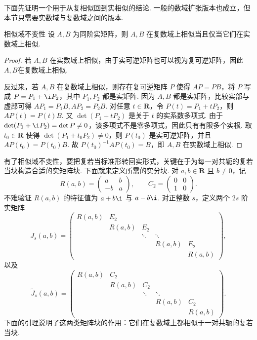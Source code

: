 下面先证明一个用于从复相似回到实相似的结论. 一般的数域扩张版本也成立，但本节只需要实数域与复数域之间的版本.

\begin{theorem}{}{相似域不变性}
    设 $A, B$ 为同阶实矩阵，则 $A, B$ 在复数域上相似当且仅当它们在实数域上相似.
\end{theorem}
\begin{proof}
    若 $A, B$ 在实数域上相似，由于实可逆矩阵也可以视为复可逆矩阵，因此$A,B$在复数域上相似.

    反过来，若 $A, B$ 在复数域上相似，则存在复可逆矩阵 $P$ 使得 $AP = PB$，将 $P$ 写成 $P = P_1 + \i P_2$，其中 $P_1, P_2$ 都是实矩阵. 因为 $A, B$ 都是实矩阵，比较实部与虚部可得 $AP_1 = P_1B, AP_2 = P_2B$. 对任意 $t \in \mathbf{R}$，令 $P(t) = P_1 + t P_2$，则 $AP(t) = P(t)B$. 又 $\det(P_1 + t P_2)$ 是关于 $t$ 的实系数多项式. 由于 $\det(P_1+\i P_2)=\det P\neq 0$，该多项式不是零多项式，因此只有有限多个实根. 取 $t_0 \in \mathbf{R}$ 使得 $\det(P_1 + t_0 P_2) \neq 0$，则 $P(t_0)$ 是实可逆矩阵，并且 $AP(t_0) = P(t_0)B$. 故 $P(t_0)^{-1}AP(t_0) = B$，即 $A, B$ 在实数域上相似.
\end{proof}

有了相似域不变性，要把复若当标准形转回实形式，关键在于为每一对共轭的复若当块构造合适的实矩阵块. 下面就来定义所需的实分块. 对 $a, b \in \mathbf{R}$ 且 $b \neq 0$，记
\[
    R(a, b) = \begin{pmatrix}
        a & b \\ -b & a
    \end{pmatrix},\qquad
    C_2 = \begin{pmatrix}
        0 & 0 \\ 1 & 0
    \end{pmatrix}.
\]
不难验证 $R(a, b)$ 的特征值为 $a + b\i$ 与 $a - b\i$. 对正整数 $s$，定义两个 $2s$ 阶实矩阵
\[
    J_s(a,b)=\begin{pmatrix}
        R(a,b) & E_2    &        &        &     \\
               & R(a,b) & E_2    &        &     \\
               &        & \ddots & \ddots &     \\
               &        &        & R(a,b) & E_2 \\
               &        &        &        & R(a,b)
    \end{pmatrix},
\]
以及
\[
    \tilde{J}_s(a,b)=\begin{pmatrix}
        R(a,b) & C_2    &        &        &     \\
               & R(a,b) & C_2    &        &     \\
               &        & \ddots & \ddots &     \\
               &        &        & R(a,b) & C_2 \\
               &        &        &        & R(a,b)
    \end{pmatrix}.
\]
下面的引理说明了这两类矩阵块的作用：它们在复数域上都相似于一对共轭的复若当块.

